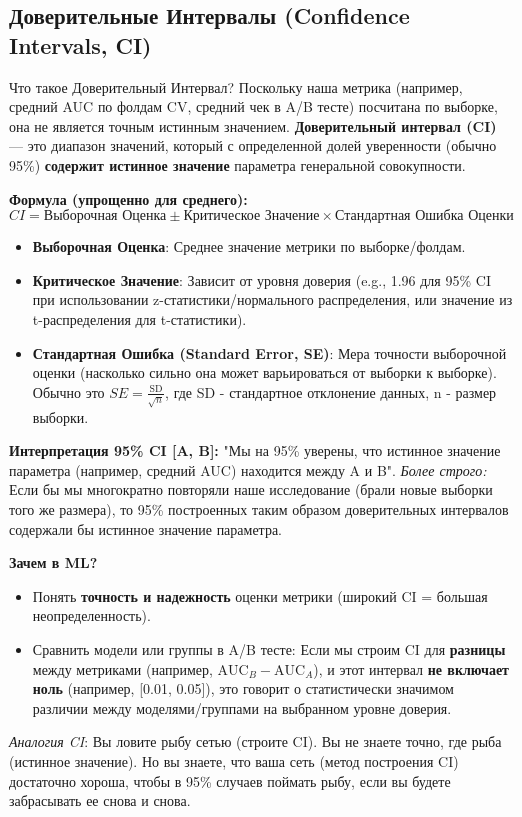 \subsection{Доверительные Интервалы (Confidence Intervals, CI)}

\begin{textbox}{Что такое Доверительный Интервал?}
Поскольку наша метрика (например, средний AUC по фолдам CV, средний чек в A/B тесте) посчитана по выборке, она не является точным истинным значением. \textbf{Доверительный интервал (CI)} — это диапазон значений, который с определенной долей уверенности (обычно 95\%) \textbf{содержит истинное значение} параметра генеральной совокупности.

\textbf{Формула (упрощенно для среднего):}
\[ CI = \text{Выборочная Оценка} \pm \text{Критическое Значение} \times \text{Стандартная Ошибка Оценки} \]
\begin{itemize}
    \item \textbf{Выборочная Оценка}: Среднее значение метрики по выборке/фолдам.
    \item \textbf{Критическое Значение}: Зависит от уровня доверия (e.g., 1.96 для 95\% CI при использовании z-статистики/нормального распределения, или значение из t-распределения для t-статистики).
    \item \textbf{Стандартная Ошибка (Standard Error, SE)}: Мера точности выборочной оценки (насколько сильно она может варьироваться от выборки к выборке). Обычно это $SE = \frac{\text{SD}}{\sqrt{n}}$, где SD - стандартное отклонение данных, n - размер выборки.
\end{itemize}

\textbf{Интерпретация 95\% CI [A, B]:}
"Мы на 95\% уверены, что истинное значение параметра (например, средний AUC) находится между A и B".
\textit{Более строго:} Если бы мы многократно повторяли наше исследование (брали новые выборки того же размера), то 95\% построенных таким образом доверительных интервалов содержали бы истинное значение параметра.

\textbf{Зачем в ML?}
\begin{itemize}
    \item Понять \textbf{точность и надежность} оценки метрики (широкий CI = большая неопределенность).
    \item Сравнить модели или группы в A/B тесте: Если мы строим CI для \textbf{разницы} между метриками (например, $\text{AUC}_B - \text{AUC}_A$), и этот интервал \textbf{не включает ноль} (например, [0.01, 0.05]), это говорит о статистически значимом различии между моделями/группами на выбранном уровне доверия.
\end{itemize}
\textit{Аналогия CI}: Вы ловите рыбу сетью (строите CI). Вы не знаете точно, где рыба (истинное значение). Но вы знаете, что ваша сеть (метод построения CI) достаточно хороша, чтобы в 95\% случаев поймать рыбу, если вы будете забрасывать ее снова и снова.
\end{textbox}

